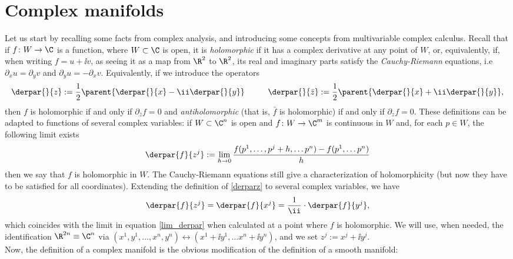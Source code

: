 \section{Complex manifolds}
Let us start by recalling some facts from complex analysis, and introducing some concepts from multivariable complex calculus. Recall that if \(f\colon W \to \C\) is a function, where \(W \subset \C\) is open, it is \textit{holomorphic} if it has a complex derivative at any point of \(W\), or, equivalently, if, when writing \(f=u+\ii v\), as seeing it as a map from \(\R^2\) to \(\R^2\), its real and imaginary parts satisfy the \textit{Cauchy-Riemann} equations, i.e \(\partial_x u=\partial_y v\) and \(\partial_y u=-\partial _x v\). Equivalently, if we introduce the operators
\begin{equation} \label{derparz}
\derpar{}{z}:=\frac{1}{2} \parent{\derpar{}{x}-\ii \derpar{}{y}} \hspace{1 cm}
\derpar{}{\bar{z}}:=\frac{1}{2}\parent{\derpar{}{x}+\ii \derpar{}{y}},
\end{equation}
then \(f\) is holomorphic if and only if \(\partial_{\bar{z}}f=0\) and \textit{antiholomorphic} (that is, \(\bar{f}\) is holomorphic) if and only if \(\partial_zf=0\). These definitions can be adapted to functions of several complex variables: if \(W \subset \C^n\) is open and \(f\colon W \to \C^m\) is continuous in \(W\) and, for each \(p \in W\), the following limit exists
\begin{equation} \label{lim_derpar}
\derpar{f}{z^j}:=\lim_{h \to 0} \frac{f(p^1, \ldots , p^j+h, \ldots p^n)-f(p^1, \ldots p^n)}{h}
\end{equation}
then we say that \(f\) is holomorphic in \(W\). The Cauchy-Riemann equations still give a characterization of holomorphicity (but now they have to be satisfied for all coordinates). Extending the definition of \eqref{derparz} to several complex variables, we have 
\[
\derpar{f}{z^j}=\derpar{f}{x^j}=\frac{1}{\ii} \cdot \derpar{f}{y^j},
\]
which coincides with the limit in equation \eqref{lim_derpar} when calculated at a point where \(f\) is holomorphic. We will use, when needed, the identification \(\R^{2n} \equiv \C^n\) via \((x^1, y^1, \ldots , x^n, y^n) \leftrightarrow (x^1+\ii y^1, \ldots x^n+\ii y^n)\), and we set \(z^j:=x^j + \ii y^j\). \\

Now, the definition of a complex manifold is the obvious modification of the definition of a smooth manifold:

